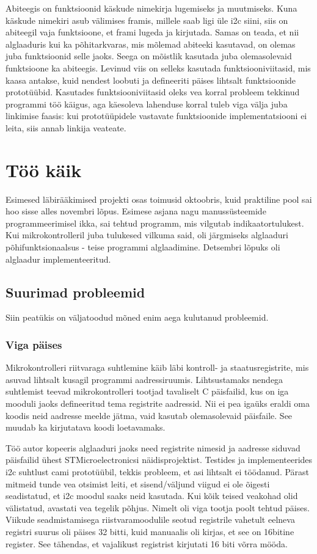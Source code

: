 \documentclass[12pt,a4paper]{article}
\begin{document}
Abiteegis on funktsioonid käskude nimekirja lugemiseks ja muutmiseks. Kuna
käskude nimekiri asub välimises \gls{fram}is, millele saab ligi üle \gls{i2c} siini, siis
on abiteegil vaja funktsioone, et \gls{fram}i lugeda ja kirjutada. Samas on teada, et
nii alglaaduris kui ka põhitarkvaras, mis mõlemad abiteeki kasutavad, on olemas
juba funktsioonid selle jaoks. Seega on mõistlik kasutada juba olemasolevaid
funktsioone ka abiteegis. Levinud viis on selleks kasutada funktsiooniviitasid,
mis kaasa antakse, kuid nendest loobuti ja defineeriti päises lihtsalt
funktsioonide prototüübid. Kasutades funktsiooniviitasid oleks vea korral
probleem tekkinud programmi töö käigus, aga käesoleva lahenduse korral tuleb
viga välja juba linkimise faasis: kui prototüüpidele vastavate funktsioonide
implementatsiooni ei leita, siis annab linkija veateate.

\section{Töö käik}
Esimesed läbirääkimised projekti osas toimusid oktoobris, kuid praktiline pool
sai hoo sisse alles novembri lõpus. Esimese asjana nagu manussüsteemide
programmeerimisel ikka, sai tehtud programm, mis vilgutab indikaatortulukest.
Kui mikrokontrolleril juba tulukesed vilkuma said, oli järgmiseks alglaaduri
põhifunktsionaalsus - teise programmi alglaadimine. Detsembri lõpuks oli
alglaadur implementeeritud.

\subsection{Suurimad probleemid}
Siin peatükis on väljatoodud mõned enim aega kulutanud probleemid.
\subsubsection{Viga päises}
Mikrokontrolleri riitvaraga suhtlemine käib läbi kontroll- ja staatusregistrite,
mis asuvad lihtsalt kusagil programmi aadressiruumis. Lihtsustamaks nendega
suhtlemist teevad mikrokontrolleri tootjad tavaliselt C päisfailid, kus on iga
mooduli jaoks defineeritud tema registrite aadressid. Nii ei pea igaüks eraldi
oma koodis neid aadresse meelde jätma, vaid kasutab olemasolevaid päisfaile. See
muudab ka kirjutatava koodi loetavamaks.

Töö autor kopeeris alglaaduri jaoks need registrite nimesid ja aadresse siduvad
päisfailid ühest STMicroelectronicsi näidisprojektist. Testides ja
implementeerides \gls{i2c} suhtlust \gls{cam}i prototüübil, tekkis probleem, et asi
lihtsalt ei töödanud. Pärast mitmeid tunde vea otsimist leiti, et
sisend/väljund viigud ei ole õigesti seadistatud, et \gls{i2c} moodul saaks neid
kasutada. Kui kõik teised veakohad olid välistatud, avastati vea tegelik põhjus.
Nimelt oli viga tootja poolt tehtud päises. Viikude seadmistamisega
riistvaramoodulile seotud registrile vahetult eelneva registri suurus oli päises
32 bitti, kuid manuaalis oli kirjas, et see on 16bitine register. See tähendas,
et vajalikust registrist kirjutati 16 biti võrra mööda. 
\end{document}
